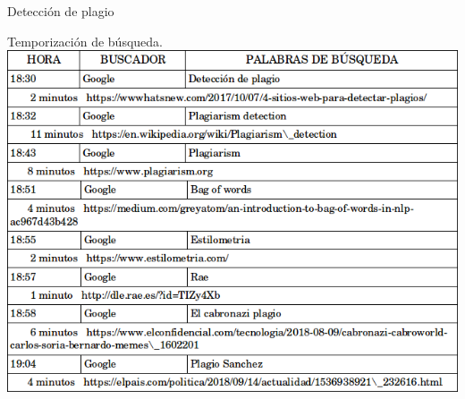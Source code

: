 \begin{section}{Detecci\'on de plagio}
		\begin{subsection}{Temporizaci\'on de b\'usqueda.}
			\includegraphics[width=1\textwidth]{plagio_tiempos.png}
		\end{subsection}
		
		
		
	\end{section}
	
	
	\newpage
	
	
	

